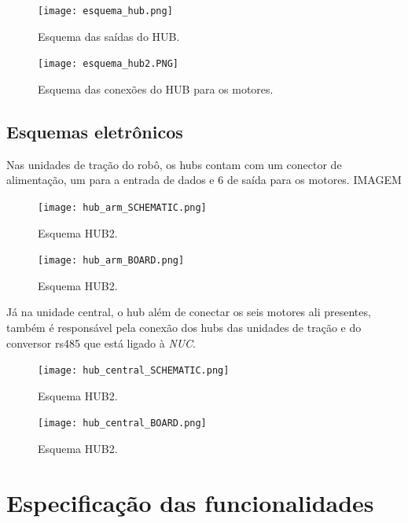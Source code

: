 \begin{figure}[h!]												
	\centering												
	\texttt{[image: esquema\_hub.png]}				
	\caption{Esquema das saídas do HUB.}		
	\label{img:hub1}									
\end{figure}

\begin{figure}[h!]												
	\centering												
	\texttt{[image: esquema\_hub2.PNG]}				
	\caption{Esquema das conexões do HUB para os motores.}		
	\label{img:hub2}									
\end{figure}

\subsection{Esquemas eletrônicos}
\label{ssec:esqe}
Nas unidades de tração do robô, os hubs contam com um conector de alimentação, um para a entrada de dados e 6 de saída para os motores.
IMAGEM
\begin{figure}[h!]												
	\centering												
	\texttt{[image: hub\_arm\_SCHEMATIC.png]}				
	\caption{Esquema HUB2.}		
	\label{img:hub2}									
\end{figure}

\begin{figure}[h!]												
	\centering												
	\texttt{[image: hub\_arm\_BOARD.png]}				
	\caption{Esquema HUB2.}		
	\label{img:hub2}									
\end{figure}

Já na unidade central, o hub além de conectar os seis motores ali presentes, também é responsável pela conexão dos hubs das unidades de tração e do conversor rs485 que está ligado à \textit{NUC}.
\begin{figure}[h!]												
	\centering												
	\texttt{[image: hub\_central\_SCHEMATIC.png]}				
	\caption{Esquema HUB2.}		
	\label{img:hub2}									
\end{figure}

\begin{figure}[h!]												
	\centering												
	\texttt{[image: hub\_central\_BOARD.png]}				
	\caption{Esquema HUB2.}		
	\label{img:hub2}									
\end{figure}

\section{Especificação das funcionalidades}
\label{sec:espf}


